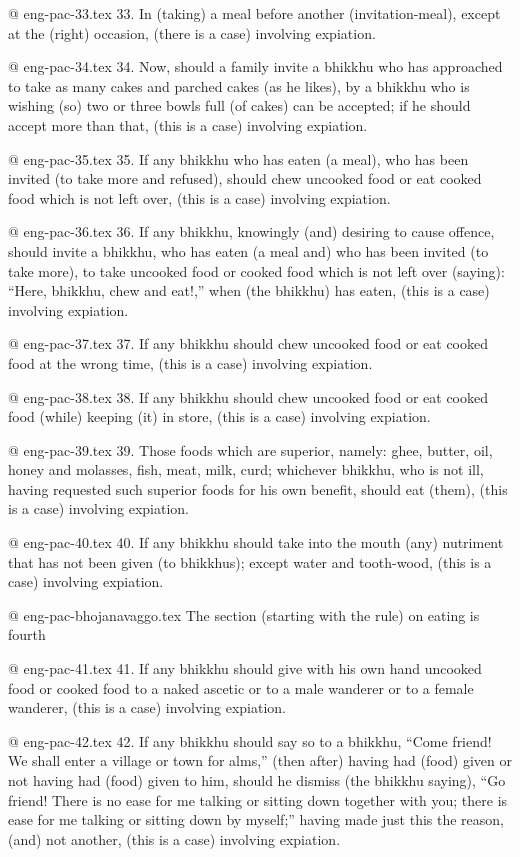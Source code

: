 @ eng-pac-33.tex
33. In (taking) a meal before another (invitation-meal), except at the (right) occasion, (there is a case) involving expiation.

@ eng-pac-34.tex
34. Now, should a family invite a bhikkhu who has approached to take as many cakes and parched cakes (as he likes), by a bhikkhu who is wishing (so) two or three bowls full (of cakes) can be accepted; if he should accept more than that, (this is a case) involving expiation.

@ eng-pac-35.tex
35. If any bhikkhu who has eaten (a meal), who has been invited (to take more and refused), should chew uncooked food or eat cooked food which is not left over, (this is a case) involving expiation.

@ eng-pac-36.tex
36. If any bhikkhu, knowingly (and) desiring to cause offence, should invite a bhikkhu, who has eaten (a meal and) who has been invited (to take more), to take uncooked food or cooked food which is not left over (saying): “Here, bhikkhu, chew and eat!,” when (the bhikkhu) has eaten, (this is a case) involving expiation.

@ eng-pac-37.tex
37. If any bhikkhu should chew uncooked food or eat cooked food at the wrong time, (this is a case) involving expiation.

@ eng-pac-38.tex
38. If any bhikkhu should chew uncooked food or eat cooked food (while) keeping (it) in store, (this is a case) involving expiation.

@ eng-pac-39.tex
39. Those foods which are superior, namely: ghee, butter, oil, honey and molasses, fish, meat, milk, curd; whichever bhikkhu, who is not ill, having requested such superior foods for his own benefit, should eat (them), (this is a case) involving expiation.

@ eng-pac-40.tex
40. If any bhikkhu should take into the mouth (any) nutriment that has not been given (to bhikkhus); except water and tooth-wood, (this is a case) involving expiation.

@ eng-pac-bhojanavaggo.tex
The section (starting with the rule) on eating is fourth

@ eng-pac-41.tex
41. If any bhikkhu should give with his own hand uncooked food or cooked food to a naked ascetic or to a male wanderer or to a female wanderer, (this is a case) involving expiation.

@ eng-pac-42.tex
42. If any bhikkhu should say so to a bhikkhu, “Come friend! We shall enter a village or town for alms,” (then after) having had (food) given or not having had (food) given to him, should he dismiss (the bhikkhu saying), “Go friend! There is no ease for me talking or sitting down together with you; there is ease for me talking or sitting down by myself;” having made just this the reason, (and) not another, (this is a case) involving expiation.

